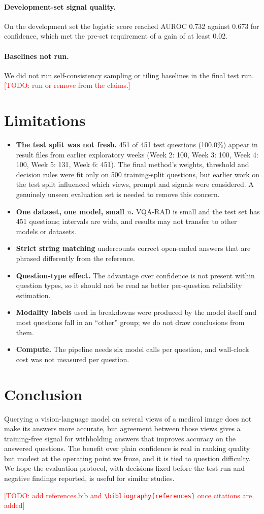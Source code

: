 \documentclass[11pt]{article}
\newcommand{\todo}[1]{\textcolor{red}{[TODO: #1]}}
\begin{document}
\paragraph{Development-set signal quality.} On the development set the logistic score reached AUROC 0.732 against 0.673 for confidence, which met the pre-set requirement of a gain of at least 0.02.
\paragraph{Baselines not run.} We did not run self-consistency sampling or tiling baselines in the final test run. \todo{run or remove from the claims.}

\section{Limitations}
\begin{itemize}
\item \textbf{The test split was not fresh.} 451 of 451 test questions (100.0\%) appear in result files from earlier exploratory weeks (Week 2: 100, Week 3: 100, Week 4: 100, Week 5: 131, Week 6: 451). The final method's weights, threshold and decision rules were fit only on 500 training-split questions, but earlier work on the test split influenced which views, prompt and signals were considered. A genuinely unseen evaluation set is needed to remove this concern.
\item \textbf{One dataset, one model, small $n$.} VQA-RAD is small and the test set has 451 questions; intervals are wide, and results may not transfer to other models or datasets.
\item \textbf{Strict string matching} undercounts correct open-ended answers that are phrased differently from the reference.
\item \textbf{Question-type effect.} The advantage over confidence is not present within question types, so it should not be read as better per-question reliability estimation.
\item \textbf{Modality labels} used in breakdowns were produced by the model itself and most questions fall in an ``other'' group; we do not draw conclusions from them.
\item \textbf{Compute.} The pipeline needs six model calls per question, and wall-clock cost was not measured per question.
\end{itemize}

\section{Conclusion}
Querying a vision-language model on several views of a medical image does not make its answers more accurate, but agreement between those views gives a training-free signal for withholding answers that improves accuracy on the answered questions. The benefit over plain confidence is real in ranking quality but modest at the operating point we froze, and it is tied to question difficulty. We hope the evaluation protocol, with decisions fixed before the test run and negative findings reported, is useful for similar studies.


\todo{add references.bib and \texttt{\textbackslash bibliography\{references\}} once citations are added}
\end{document}
